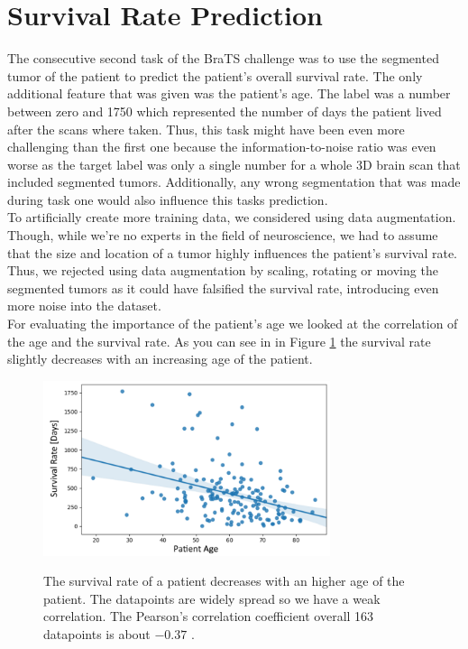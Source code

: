 \documentclass[a4paper,12pt,pagesize,headsepline,bibtotoc,titlepage]{scrartcl}
\begin{document}
\section{Survival Rate Prediction}
\label{sec:survival}
The consecutive second task of the BraTS challenge was to use the segmented tumor of the patient to predict the patient's overall survival rate.
The only additional feature that was given was the patient's age.
The label was a number between zero and 1750 which represented the number of days the patient lived after the scans where taken.
Thus, this task might have been even more challenging than the first one because the information-to-noise ratio was even worse as the target label was only a single number for a whole 3D brain scan that included segmented tumors.
Additionally, any wrong segmentation that was made during task one would also influence this tasks prediction.\\
To artificially create more training data, we considered using data augmentation.
Though, while we're no experts in the field of neuroscience, we had to assume that the size and location of a tumor highly influences the patient's survival rate.
Thus, we rejected using data augmentation by scaling, rotating or moving the segmented tumors as it could have falsified the survival rate, introducing even more noise into the dataset. \\

For evaluating the importance of the patient's age we looked at the correlation of the age and the survival rate. As you can see in in Figure \ref{fig:sr_vs_age} the survival rate slightly decreases with an increasing age of the patient.

\begin{figure}[hbp]
\begin{center}
\includegraphics*[width=0.75\textwidth]{images/Survival_vs_Age.png}\\
\caption{The survival rate of a patient decreases with an higher age of the patient. The datapoints are widely spread so we have a weak correlation. The Pearson's correlation coefficient overall 163 datapoints is about $-0.37$ . }
\label{fig:sr_vs_age}
\end{center}
\end{figure}
\end{document}
